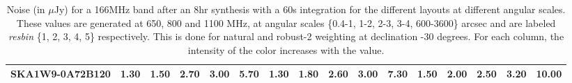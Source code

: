 \begin{table}[!htp]
{{\begin{tabular}{|lccccc||ccccc||ccccc|}
SKA1W9-0A72B120 & 1.30 \cellcolor{blue!39.00} & 1.50 \cellcolor{red!32.00} & 2.70 \cellcolor{green!60.00} & 3.00 \cellcolor{orange!60.00} & 5.70 \cellcolor{purple!60.00} & 1.30 \cellcolor{blue!34.80} & 1.80 \cellcolor{red!49.50} & 2.60 \cellcolor{green!60.00} & 3.00 \cellcolor{orange!60.00} & 7.30 \cellcolor{purple!60.00} & 1.50 \cellcolor{blue!60.00} & 2.00 \cellcolor{red!60.00} & 2.50 \cellcolor{green!60.00} & 3.20 \cellcolor{orange!60.00} & 10.00 \cellcolor{purple!18.00}\\ \hline 
\end{tabular}}
\hspace{1cm} 

\vspace{.0cm}
\caption{Noise (in $\mu$Jy) for a 166MHz band after an 8hr synthesis with a 60s integration for the different layouts at different angular scales. These values are generated at 650, 800 and 1100 MHz, at angular scales \{0.4-1, 1-2, 2-3, 3-4, 600-3600\} arcsec and are labeled {\it resbin} \{1, 2, 3, 4, 5\} respectively. This is done for natural and robust-2 weighting at declination -30 degrees. For each column, the intensity of the color increases with the value.}\label{tab:noise166}}
 \end{table}

